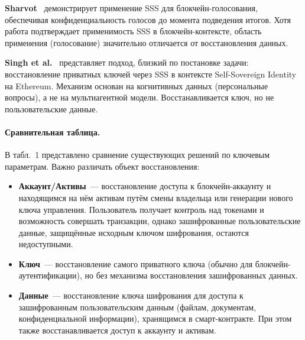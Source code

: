\textbf{Sharvot}~\cite{s13} демонстрирует применение SSS для блокчейн-голосования, обеспечивая конфиденциальность голосов до момента подведения итогов. Хотя работа подтверждает применимость SSS в блокчейн-контексте, область применения (голосование) значительно отличается от восстановления данных.

\textbf{Singh et al.}~\cite{s14} представляет подход, близкий по постановке задачи: восстановление приватных ключей через SSS в контексте Self-Sovereign Identity на Ethereum. Механизм основан на когнитивных данных (персональные вопросы), а не на мультиагентной модели. Восстанавливается ключ, но не пользовательские данные.

\paragraph{Сравнительная таблица.}

В табл.~1 представлено сравнение существующих решений по ключевым параметрам. Важно различать объект восстановления:

\begin{itemize}
\item
\textbf{Аккаунт/Активы}~--- восстановление доступа к блокчейн-аккаунту и находящимся на нём активам путём смены владельца или генерации нового ключа управления. Пользователь получает контроль над токенами и возможность совершать транзакции, однако зашифрованные пользовательские данные, защищённые исходным ключом шифрования, остаются недоступными.

\item
\textbf{Ключ}~--- восстановление самого приватного ключа (обычно для блокчейн-аутентификации), но без механизма восстановления зашифрованных данных.

\item
\textbf{Данные}~--- восстановление ключа шифрования для доступа к зашифрованным пользовательским данным (файлам, документам, конфиденциальной информации), хранящимся в смарт-контракте. При этом также восстанавливается доступ к аккаунту и активам.
\end{itemize}

